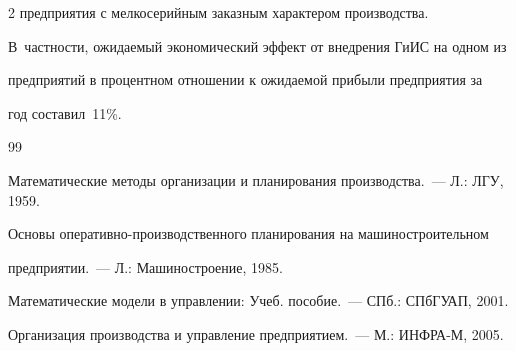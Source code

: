 \begin{multicols}{2}
предприятия с мелкосерийным заказным характером производства. 


В~частности, ожидаемый экономический эффект от внедрения ГиИС на одном из 


предприятий в процентном отношении к ожидаемой прибыли предприятия за 


год составил~11\%.





{\small\frenchspacing


{%




\begin{thebibliography}{99}









Математические методы организации и планирования производства.~--- Л.: ЛГУ, 1959.















Основы оперативно-про\-из\-вод\-ст\-вен\-но\-го планирования на машиностроительном 


предприятии.~--- Л.: Машиностроение, 1985.









Математические модели в управлении: Учеб. пособие.~--- СПб.: \mbox{СПбГУАП}, 2001.












Организация производства и управление предприятием.~--- М.: ИНФРА-М, 2005.










\end{thebibliography}}}
\end{multicols}
